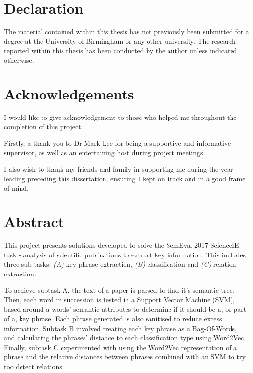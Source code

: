 \documentclass{article}
\begin{document}

\section*{Declaration}
The material contained within this thesis has not previously been submitted for a degree at the University of Birmingham or any other university. The research reported within this thesis has been conducted by the author unless indicated otherwise.

\pagebreak

\section*{Acknowledgements}
I would like to give acknowledgement to those who helped me throughout the completion of this project.\par

Firstly, a thank you to Dr Mark Lee for being a supportive and informative supervisor, as well as an entertaining host during project meetings.\par

I also wish to thank my friends and family in supporting me during the year leading preceding this dissertation, ensuring I kept on track and in a good frame of mind.\par

\pagebreak

\section*{Abstract}
This project presents solutions developed to solve the SemEval 2017 ScienceIE task - analysis of scientific publications to extract key information. This includes three sub tasks: \textit{(A)} key phrase extraction, \textit{(B)} classification and \textit{(C)} relation extraction.\par

To achieve subtask A, the text of a paper is parsed to find it's semantic tree. Then, each word in succession is tested in a Support Vector Machine (SVM), based around a words' semantic attributes to determine if it should be a, or part of a, key phrase. Each phrase generated is also sanitised to reduce excess information. Subtask B involved treating each key phrase as a Bag-Of-Words, and calculating the phrases' distance to each classification type using Word2Vec. Finally, subtask C experimented with using the Word2Vec representation of a phrase and the relative distances between phrases combined with an SVM to try too detect relations. \par
\end{document}
